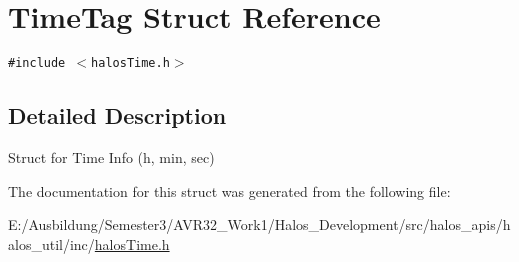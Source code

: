 \hypertarget{struct_time_tag}{
\section{TimeTag Struct Reference}
\label{struct_time_tag}
}
{\tt \#include $<$halosTime.h$>$}



\subsection{Detailed Description}
Struct for Time Info (h, min, sec) 

The documentation for this struct was generated from the following file:\begin{CompactItemize}
\item 
E:/Ausbildung/Semester3/AVR32\_\-Work1/Halos\_\-Development/src/halos\_\-apis/halos\_\-util/inc/\hyperlink{halos_time_8h}{halosTime.h}\end{CompactItemize}
